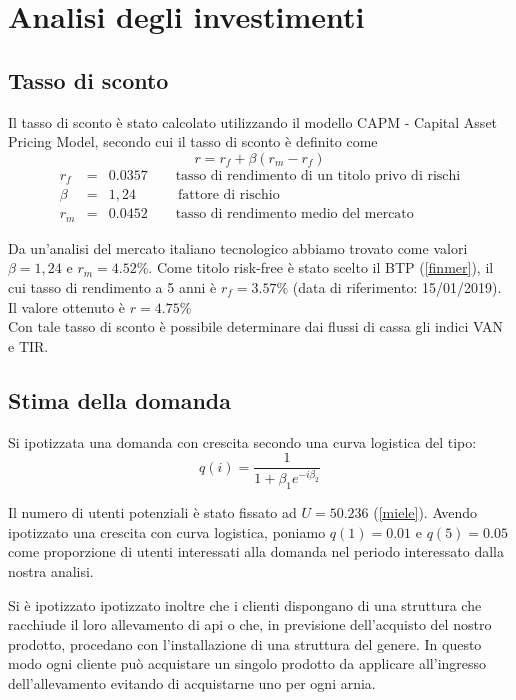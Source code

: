 \section{Analisi degli investimenti}
\subsection{Tasso di sconto}
Il tasso di sconto è stato calcolato utilizzando il modello CAPM - Capital Asset
Pricing Model, secondo cui il tasso di sconto è definito come
\begin{displaymath}
r = r_f + \beta (r_m - r_f )
\end{displaymath}
\begin{eqnarray*}
r_f &=& 0.0357 \qquad \mbox{tasso di rendimento di un titolo privo di rischi} \\ 
\beta &=& 1,24 \quad\qquad \mbox{fattore di rischio} \\
r_m &=& 0.0452 \qquad \mbox{tasso di rendimento medio del mercato}
\end{eqnarray*}

Da un’analisi del mercato italiano tecnologico abbiamo trovato come valori
$\beta=1,24$ e $r_m=4.52\%$. Come titolo risk-free è stato scelto il BTP
(\ref{finmer}), il cui tasso di rendimento a 5 anni è $r_f=3.57\%$ (data di
riferimento: 15/01/2019).\\ 
Il valore ottenuto è $r = 4.75\%$\\
Con tale tasso di sconto è possibile determinare dai flussi di cassa gli indici
VAN e TIR.
%
%
\subsection{Stima della domanda}
Si ipotizzata una domanda con crescita secondo una curva logistica del tipo: 
\begin{displaymath}
q(i) = \frac{1}{1 + \beta_1 e^{-i\beta_2}}
\end{displaymath}

Il numero di utenti potenziali è stato fissato ad $U=50.236$ (\ref{miele}).
Avendo ipotizzato una crescita con curva logistica, poniamo $q(1)=0.01$ e
$q(5)=0.05$ come proporzione di utenti interessati alla domanda nel periodo
interessato dalla nostra analisi.  

Si è ipotizzato ipotizzato inoltre che i clienti dispongano di una struttura che
racchiude il loro allevamento di api o che, in previsione dell’acquisto del
nostro prodotto, procedano con l’installazione di una struttura del genere. In
questo modo ogni cliente può acquistare un singolo prodotto da applicare
all’ingresso dell’allevamento evitando di acquistarne uno per ogni arnia.

